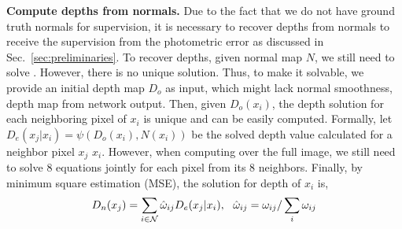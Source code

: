 \textbf{Compute depths from normals.} 
Due to the fact that we do not have ground truth normals for supervision, it is necessary to recover depths from normals to receive the supervision from the photometric error as discussed in Sec.~\ref{sec:preliminaries}.
To recover depths, given normal map $N$, we still need to solve . However, there is no unique solution. Thus, to make it solvable, we provide an initial depth map $D_o$ as input, which might lack normal smoothness, \eg depth map from network output. Then, given $D_o(x_i)$, the depth solution for each neighboring pixel of $x_i$ is unique and can be easily computed. Formally, let $D_e(x_j | x_i) = \psi(D_o(x_i), N(x_i))$ be the solved depth value calculated for a neighbor pixel $x_j$ \wrt $x_i$. 
However, when computing over the full image, we still need to solve 8 equations jointly for each pixel from its 8 neighbors. Finally, by minimum square estimation (MSE), the solution for depth of $x_i$ is,
\begin{align}
\label{eq:depth}
D_n(x_j) = \sum_{i\in{\mathcal N}}\hat{\omega}_{ij}D_e(x_j | x_i), \text{~~}
\hat{\omega}_{ij} = \omega_{ij} / \sum_i{\omega_{ij}}
\end{align}


\vspace{-0.7\baselineskip}
